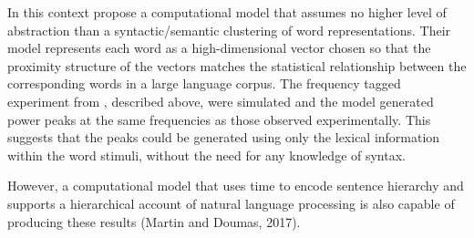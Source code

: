 \documentclass[10pt,letterpaper]{article}
\begin{document}

In this context \cite{FrankYang2018} propose a computational model that
assumes no higher level of abstraction than a syntactic/semantic
clustering of word representations. Their model represents each word
as a high-dimensional vector chosen so that the proximity structure of
the vectors matches the statistical relationship between the
corresponding words in a large language corpus. The frequency tagged
experiment from \cite{DingEtAl2016}, described above, were simulated
and the model generated power peaks at the same frequencies as those
observed experimentally. This suggests that the peaks could be
generated using only the lexical information within the word stimuli,
without the need for any knowledge of syntax. 




However, a computational model that uses time to
encode sentence hierarchy and supports a hierarchical account of
natural language processing is also capable of producing these results
(Martin and Doumas, 2017).




%
%
\end{document}
